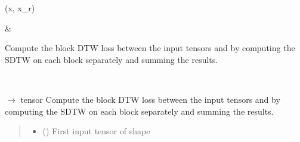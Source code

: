 \documentclass[letterpaper,10pt,english]{sphinxmanual}
\begin{document}
\begin{fulllineitems}
\begin{savenotes}
\begin{longtable}{}
\\
\sphinxtoprule
\endhead

\sphinxbottomrule
{}\\
\endfoot

\endlastfoot
\sphinxtableatstartofbodyhook
\begin{varwidth}[t]{}
\sphinxAtStartPar
{\hyperref[\detokenize{dtw_loss_functions.block_dtw:dtw_loss_functions.block_dtw.block_dtw_naive.forward}]{}}(x, x\_r)
\sphinxbeforeendvarwidth
\end{varwidth}%
&\begin{varwidth}[t]{}
\sphinxAtStartPar
Compute the block DTW loss between the input tensors  and  by computing the SDTW on each block separately and summing the results.
\sphinxbeforeendvarwidth
\end{varwidth}%
\\
\sphinxbottomrule
\end{longtable}
\sphinxtableafterendhook
\sphinxatlongtableend
\end{savenotes}

\begin{fulllineitems}
\label{\detokenize{dtw_loss_functions.block_dtw:dtw_loss_functions.block_dtw.block_dtw_naive.forward}}
\pysigstartsignatures
\pysiglinewithargsret
{}
{\sphinxparamcomma {}}
{{ $\rightarrow$ tensor}}
\pysigstopsignatures
\sphinxAtStartPar
Compute the block DTW loss between the input tensors  and  by computing the SDTW on each block separately and summing the results.
\begin{quote}\begin{description}
\begin{itemize}
\item {} 
\sphinxAtStartPar
{} () \textendash{} First input tensor of shape 


\end{itemize}
\end{description}
\end{quote}
\end{fulllineitems}
\end{fulllineitems}
\end{document}
